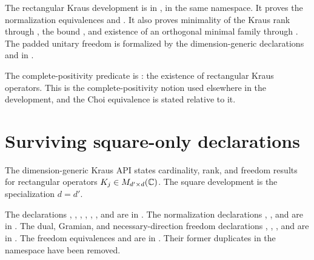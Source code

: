 \documentclass{article}
\begin{document}
The rectangular Kraus development is in
, in the same namespace. It proves
the normalization equivalences
 and
. It also proves minimality of
the Kraus rank through
, the bound
, and existence of an orthogonal minimal family
through . The padded unitary
freedom is formalized by the dimension-generic declarations
 and
 in
.

The complete-positivity predicate is : the existence of
rectangular Kraus operators. This is the complete-positivity notion used
elsewhere in the development, and the Choi equivalence is stated relative to
it.

\section{Surviving square-only declarations}

The dimension-generic Kraus API states cardinality, rank, and freedom results
for rectangular operators $K_j\in M_{d'\times d}(\mathbb{C})$. The square development
is the specialization $d=d'$.

The declarations ,
, ,
,
,
, and
 are in
. The normalization declarations
,
, and
 are in
. The dual, Gramian, and
necessary-direction freedom declarations
,
,
, and
 are in
. The freedom equivalences
 and
 are in
. Their former duplicates in the
 namespace have been removed.
\end{document}
